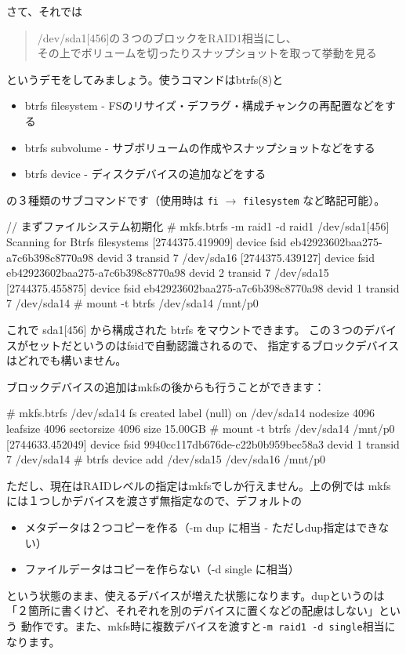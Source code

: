 \documentclass[mingoth,a4paper]{jsarticle}
\begin{document}
さて、それでは
\begin{quote}
\Large{/dev/sda1[456]の３つのブロックをRAID1相当にし、\\
その上でボリュームを切ったりスナップショットを取って挙動を見る}
\end{quote}
というデモをしてみましょう。使うコマンドはbtrfs(8)と
\begin{itemize}
\item
btrfs filesystem - FSのリサイズ・デフラグ・構成チャンクの再配置などをする
\item
btrfs subvolume - サブボリュームの作成やスナップショットなどをする
\item
btrfs device - ディスクデバイスの追加などをする
\end{itemize}
の３種類のサブコマンドです（使用時は
\verb|fi| $\rightarrow$ \verb|filesystem|
など略記可能）。
\begin{commandline}
// まずファイルシステム初期化
# mkfs.btrfs -m raid1 -d raid1 /dev/sda1[456]
Scanning for Btrfs filesystems
[2744375.419909] device fsid eb42923602baa275-a7c6b398c8770a98 devid 3 transid 7 /dev/sda16
[2744375.439127] device fsid eb42923602baa275-a7c6b398c8770a98 devid 2 transid 7 /dev/sda15
[2744375.455875] device fsid eb42923602baa275-a7c6b398c8770a98 devid 1 transid 7 /dev/sda14
# mount -t btrfs /dev/sda14 /mnt/p0
\end{commandline}
これで sda1[456] から構成された btrfs をマウントできます。
この３つのデバイスがセットだというのはfsidで自動認識されるので、
指定するブロックデバイスはどれでも構いません。

ブロックデバイスの追加はmkfsの後からも行うことができます：
\begin{commandline}
# mkfs.btrfs /dev/sda14
fs created label (null) on /dev/sda14
        nodesize 4096 leafsize 4096 sectorsize 4096 size 15.00GB
# mount -t btrfs /dev/sda14 /mnt/p0
[2744633.452049] device fsid 9940cc117db676de-c22b0b959bec58a3 devid 1 transid 7 /dev/sda14
# btrfs device add /dev/sda15 /dev/sda16 /mnt/p0
\end{commandline}
ただし、現在はRAIDレベルの指定はmkfsでしか行えません。上の例では
mkfsには１つしかデバイスを渡さず無指定なので、デフォルトの
\begin{itemize}
\item メタデータは２つコピーを作る（-m dup に相当 - ただしdup指定はできない）
\item ファイルデータはコピーを作らない（-d single に相当）
\end{itemize}
という状態のまま、使えるデバイスが増えた状態になります。dupというのは
「２箇所に書くけど、それぞれを別のデバイスに置くなどの配慮はしない」という
動作です。また、mkfs時に複数デバイスを渡すと\verb|-m raid1 -d single|相当に
なります\cite{nilbtrmd}。
\end{document}
